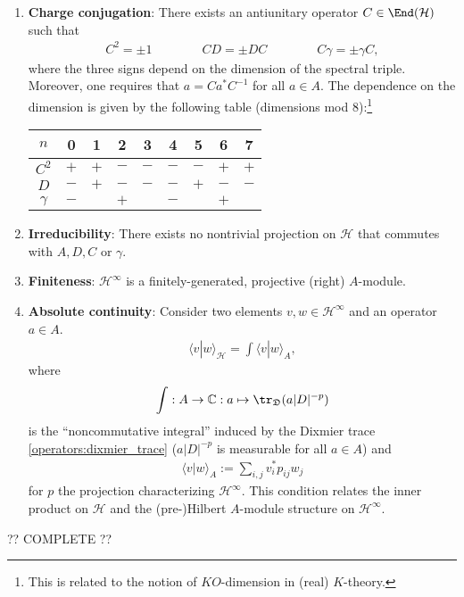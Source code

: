 \begin{remark}
\begin{enumerate}
            \item\textbf{Charge conjugation}: There exists an antiunitary operator $C\in\End(\mathcal{H})$ such that
            \begin{gather}
                C^2=\pm1\qquad\qquad CD=\pm DC\qquad\qquad C\gamma=\pm\gamma C,
            \end{gather}
            where the three signs depend on the dimension of the spectral triple. Moreover, one requires that $a=Ca^*C^{-1}$ for all $a\in A$. The dependence on the dimension is given by the following table (dimensions mod 8):\footnote{This is related to the notion of $K\!O$-dimension in (real) $K$-theory.}
            \begin{center}
                \begin{tabular}{|c|c|c|c|c|c|c|c|c|}
                    \hline
                    $n$&0&1&2&3&4&5&6&7\\
                    \hline
                    $C^2$&$+$&$+$&$-$&$-$&$-$&$-$&$+$&$+$\\
                    \hline
                    $D$&$-$&$+$&$-$&$-$&$-$&$+$&$-$&$-$\\
                    \hline
                    $\gamma$&$-$&&$+$&&$-$&&$+$&\\
                    \hline
                \end{tabular}
            \end{center}
            \item\textbf{Irreducibility}: There exists no nontrivial projection on $\mathcal{H}$ that commutes with $A,D,C$ or $\gamma$.
            \item\textbf{Finiteness}: $\mathcal{H}^\infty$ is a finitely-generated, projective (right) $A$-module.
            \item\textbf{Absolute continuity}: Consider two elements $v,w\in\mathcal{H}^\infty$ and an operator $a\in A$.
                \begin{gather}
                    \langle v|w \rangle_\mathcal{H} = \int\langle v|w \rangle_A,
                \end{gather}
                where
                \begin{gather}
                    \int:A\rightarrow\mathbb{C}:a\mapsto\tr_\mathfrak{D}(a|D|^{-p})
                \end{gather}
                is the ``noncommutative integral'' induced by the Dixmier trace \ref{operators:dixmier_trace} ($a|D|^{-p}$ is measurable for all $a\in A$) and
                \begin{gather}
                    \langle v|w \rangle_A := \sum_{i,j} v^*_ip_{ij}w_j
                \end{gather}
                for $p$ the projection characterizing $\mathcal{H}^\infty$. This condition relates the inner product on $\mathcal{H}$ and the (pre-)Hilbert $A$-module structure on $\mathcal{H}^\infty$.
        \end{enumerate}
        ?? COMPLETE ??
    \end{remark}

